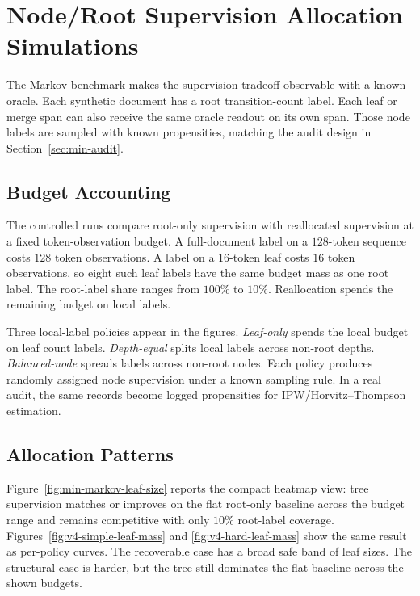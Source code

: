 \section{Node/Root Supervision Allocation Simulations}\label{app:v4-supervision-allocation}

The Markov benchmark makes the supervision tradeoff observable with a known
oracle. Each synthetic document has a root transition-count label. Each leaf
or merge span can also receive the same oracle readout on its own span. Those
node labels are sampled with known propensities, matching the audit design in
Section~\ref{sec:min-audit}.

\subsection{Budget Accounting}

The controlled runs compare root-only supervision with reallocated
supervision at a fixed token-observation budget. A full-document label on a
$128$-token sequence costs $128$ token observations. A label on a $16$-token
leaf costs $16$ token observations, so eight such leaf labels have the same
budget mass as one root label. The root-label share ranges from $100\%$ to
$10\%$. Reallocation spends the remaining budget on local labels.

Three local-label policies appear in the figures. \emph{Leaf-only} spends the
local budget on leaf count labels. \emph{Depth-equal} splits local labels
across non-root depths. \emph{Balanced-node} spreads labels across non-root
nodes. Each policy produces randomly assigned node supervision under a known
sampling rule. In a real audit, the same records become logged propensities
for IPW/Horvitz--Thompson estimation.

\subsection{Allocation Patterns}

Figure~\ref{fig:min-markov-leaf-size} reports the compact heatmap view:
tree supervision matches or improves on the flat root-only baseline across
the budget range and remains competitive with only $10\%$ root-label
coverage. Figures~\ref{fig:v4-simple-leaf-mass} and
\ref{fig:v4-hard-leaf-mass} show the same result as per-policy curves. The
recoverable case has a broad safe band of leaf sizes. The structural case is
harder, but the tree still dominates the flat baseline across the shown
budgets.

